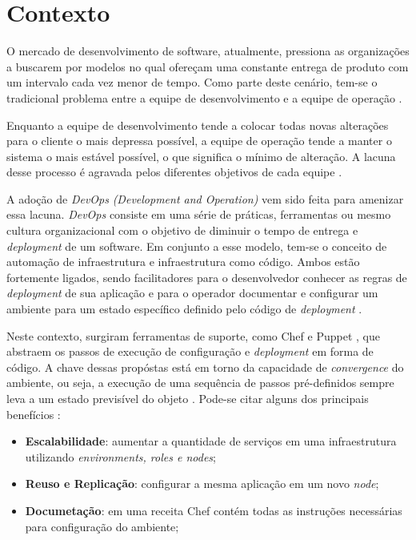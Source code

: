 \section{Contexto}
\label{sec:contexto}

O mercado de desenvolvimento de software, atualmente, pressiona as organizações
a buscarem por modelos no qual ofereçam uma constante entrega de produto com
um intervalo cada vez menor de tempo. Como parte deste cenário, tem-se o
tradicional problema entre a equipe de desenvolvimento e a equipe de operação
\cite{hummer:2013}.

Enquanto a equipe de desenvolvimento tende a colocar todas novas alterações
para o cliente o mais depressa possível, a equipe de operação tende a manter
o sistema o mais estável possível, o que significa o mínimo de alteração.
A lacuna desse processo é agravada pelos diferentes objetivos de cada equipe
\cite{huttermann:2012}.

A adoção de \textit{DevOps} \textit{(Development and Operation)} vem sido feita
para amenizar essa lacuna. \textit{DevOps} consiste em uma série de práticas,
ferramentas ou mesmo cultura organizacional com o objetivo de diminuir o tempo
de entrega e \textit{deployment} de um software. Em conjunto a
esse modelo, tem-se o conceito de automação de infraestrutura e infraestrutura
como código. Ambos estão fortemente ligados, sendo facilitadores para o
desenvolvedor conhecer as regras de \textit{deployment} de sua aplicação
e para o operador documentar e configurar um ambiente para um estado específico
definido pelo código de \textit{deployment} \cite{hummer:2013}.

Neste contexto, surgiram ferramentas de suporte, como Chef \cite{chef:2016} e
Puppet \cite{puppet:2016}, que abstraem os passos de execução de configuração
e \textit{deployment} em forma de código. A chave dessas propóstas está em torno
da capacidade de \textit{convergence} do ambiente, ou seja, a execução de uma
sequência de passos pré-definidos sempre leva a um estado previsível do objeto
\cite{hummer:2013}. Pode-se citar alguns dos principais benefícios
\cite{vasiliev:2014}:

\begin{itemize}
  \item \textbf{Escalabilidade}: aumentar a quantidade de serviços em uma infraestrutura
    utilizando \textit{environments, roles e nodes};
  \item \textbf{Reuso e Replicação}: configurar a mesma aplicação em um novo \textit{node};
  \item \textbf{Documetação}: em uma receita Chef contém todas as instruções necessárias
    para configuração do ambiente;
\end{itemize}

